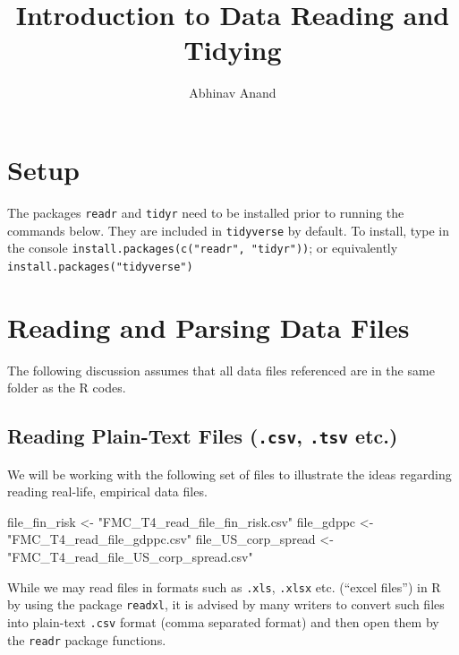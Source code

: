 \documentclass[11pt,]{article}
\title{Introduction to Data Reading and Tidying}
\author{Abhinav Anand}
\date{}
\newenvironment{Shaded}{\begin{snugshade}}{\end{snugshade}}
\newcommand{\StringTok}[1]{\textcolor[rgb]{0.31,0.60,0.02}{#1}}
\newcommand{\NormalTok}[1]{#1}
\begin{document}
\maketitle

\section{Setup}\label{setup}

The packages \texttt{readr} and \texttt{tidyr} need to be installed
prior to running the commands below. They are included in
\texttt{tidyverse} by default. To install, type in the console
\texttt{install.packages(c("readr",\ "tidyr"))}; or equivalently
\texttt{install.packages("tidyverse")}

\section{Reading and Parsing Data
Files}\label{reading-and-parsing-data-files}

The following discussion assumes that all data files referenced are in
the same folder as the R codes.

\subsection{\texorpdfstring{Reading Plain-Text Files (\texttt{.csv},
\texttt{.tsv}
etc.)}{Reading Plain-Text Files (.csv, .tsv etc.)}}\label{reading-plain-text-files-.csv-.tsv-etc.}

We will be working with the following set of files to illustrate the
ideas regarding reading real-life, empirical data files.

\begin{Shaded}
\begin{Highlighting}[]
\NormalTok{file_fin_risk <-}\StringTok{ "FMC_T4_read_file_fin_risk.csv"}
\NormalTok{file_gdppc <-}\StringTok{ "FMC_T4_read_file_gdppc.csv"}
\NormalTok{file_US_corp_spread <-}\StringTok{ "FMC_T4_read_file_US_corp_spread.csv"}
\end{Highlighting}
\end{Shaded}

While we may read files in formats such as \texttt{.xls}, \texttt{.xlsx}
etc. (``excel files'') in R by using the package \texttt{readxl}, it is
advised by many writers to convert such files into plain-text
\texttt{.csv} format (comma separated format) and then open them by the
\texttt{readr} package functions.
\end{document}
